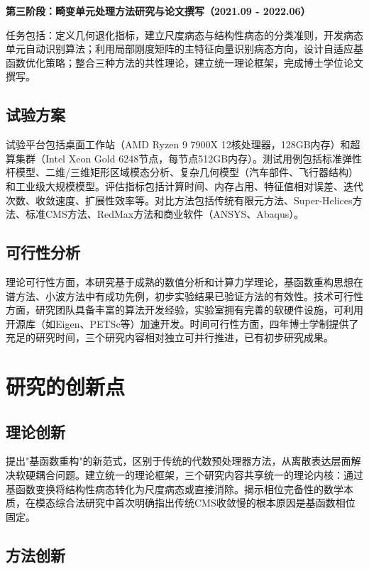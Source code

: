 \textbf{第三阶段：畸变单元处理方法研究与论文撰写（2021.09 - 2022.06）}

任务包括：定义几何退化指标，建立尺度病态与结构性病态的分类准则，开发病态单元自动识别算法；利用局部刚度矩阵的主特征向量识别病态方向，设计自适应基函数优化策略；整合三种方法的共性理论，建立统一理论框架，完成博士学位论文撰写。

\subsection{试验方案}

试验平台包括桌面工作站（AMD Ryzen 9 7900X 12核处理器，128GB内存）和超算集群（Intel Xeon Gold 6248节点，每节点512GB内存）。测试用例包括标准弹性杆模型、二维/三维矩形区域模态分析、复杂几何模型（汽车部件、飞行器结构）和工业级大规模模型。评估指标包括计算时间、内存占用、特征值相对误差、迭代次数、收敛速度、扩展性效率等。对比方法包括传统有限元方法、Super-Helices方法、标准CMS方法、RedMax方法和商业软件（ANSYS、Abaqus）。

\subsection{可行性分析}

理论可行性方面，本研究基于成熟的数值分析和计算力学理论，基函数重构思想在谱方法、小波方法中有成功先例，初步实验结果已验证方法的有效性。技术可行性方面，研究团队具备丰富的算法开发经验，实验室拥有完善的软硬件设施，可利用开源库（如Eigen、PETSc等）加速开发。时间可行性方面，四年博士学制提供了充足的研究时间，三个研究内容相对独立可并行推进，已有初步研究成果。

\section{研究的创新点}

\subsection{理论创新}

提出"基函数重构"的新范式，区别于传统的代数预处理器方法，从离散表达层面解决软硬耦合问题。建立统一的理论框架，三个研究内容共享统一的理论内核：通过基函数变换将结构性病态转化为尺度病态或直接消除。揭示相位完备性的数学本质，在模态综合法研究中首次明确指出传统CMS收敛慢的根本原因是基函数相位固定。

\subsection{方法创新}

